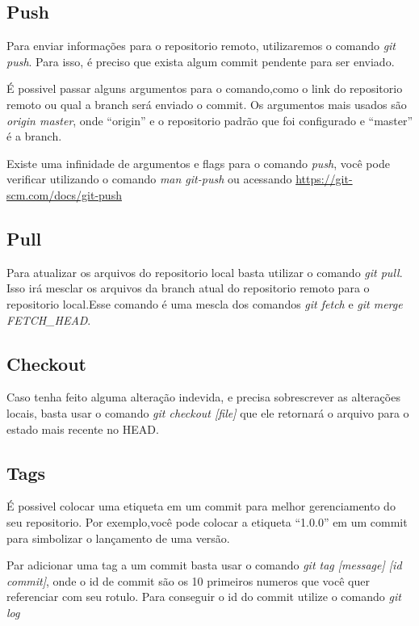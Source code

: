 \documentclass[]{article}
\begin{document}
\subsection*{Push}
Para enviar informações para o repositorio remoto, utilizaremos o comando \textit{git push}. 
Para isso, é preciso que exista algum commit pendente para ser enviado.

É possivel passar alguns argumentos para o comando,como o link do repositorio remoto ou qual a branch será enviado o commit.
Os argumentos mais usados são \textit{origin master}, onde ``origin'' e o repositorio padrão que foi configurado e ``master'' é a branch.

Existe uma infinidade de argumentos e flags para o comando \textit{push}, 
você pode verificar utilizando o comando \textit{man git-push} ou acessando \url{https://git-scm.com/docs/git-push}

\subsection*{Pull}

Para atualizar os arquivos do repositorio local basta utilizar o comando \textit{git pull}. 
Isso irá mesclar os arquivos da branch atual do repositorio remoto para o repositorio local.Esse comando é uma mescla dos comandos 
\textit{git fetch} e \textit{git merge FETCH\_HEAD}.

\subsection*{Checkout}

Caso tenha feito alguma alteração indevida, e precisa sobrescrever as alterações locais,
 basta usar o comando \textit{git checkout [file]} que ele retornará o arquivo para o estado mais recente no HEAD.
 \subsection*{Tags}

 É possivel colocar uma etiqueta em um commit para melhor gerenciamento do seu repositorio.
 Por exemplo,você pode colocar a etiqueta ``1.0.0'' em um commit para simbolizar o lançamento de uma versão.

 Par adicionar uma tag a um commit basta usar o comando \textit{git tag [message] [id commit]},
  onde o id de commit são os 10 primeiros numeros que você quer referenciar com seu rotulo.
  Para conseguir o id do commit utilize o comando \textit{git log}
\end{document}
